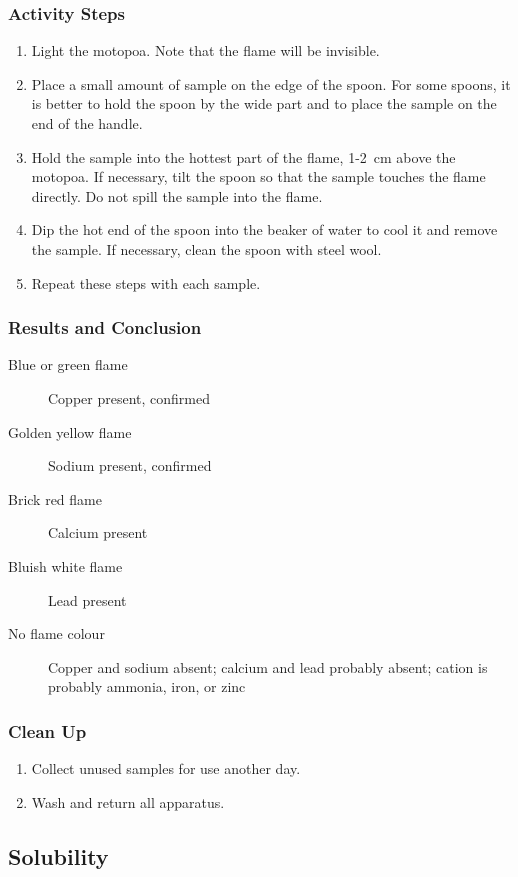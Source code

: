 \subsubsection{Activity Steps}
\begin{enumerate}
\item{Light the motopoa. Note that the flame will be invisible.}
\item{Place a small amount of sample on the edge of the spoon. For some spoons, it is better to hold the spoon by the wide part and to place the sample on the end of the handle.}
\item{Hold the sample into the hottest part of the flame, 1-2~cm above the motopoa. If necessary, tilt the spoon so that the sample touches the flame directly. Do not spill the sample into the flame.}
\item{Dip the hot end of the spoon into the beaker of water to cool it and remove the sample. If necessary, clean the spoon with steel wool.}
\item{Repeat these steps with each sample.}
\end{enumerate}

\subsubsection{Results and Conclusion}
\begin{description}
\item[Blue or green flame]{Copper present, confirmed}
\item[Golden yellow flame]{Sodium present, confirmed}
\item[Brick red flame]{Calcium present}
\item[Bluish white flame]{Lead present}
\item[No flame colour]{Copper and sodium absent; calcium and lead probably absent; cation is probably ammonia, iron, or zinc}
\end{description}

\subsubsection{Clean Up}
\begin{enumerate}
\item{Collect unused samples for use another day.}
\item{Wash and return all apparatus.}
\end{enumerate}

\subsection{Solubility}

